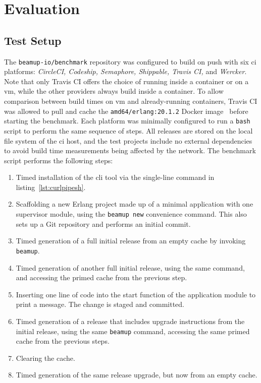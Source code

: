 \cleardoublepage
\section{Evaluation}


\subsection{Test Setup}
The \lstinline|beamup-io/benchmark| repository was configured to build on push with six \acrshort{ci} platforms: \emph{CircleCI, Codeship, Semaphore, Shippable, Travis CI,} and \emph{Wercker}. Note that only Travis CI offers the choice of running inside a container or on a \acrshort{vm}, while the other providers always build inside a container. To allow comparison between build times on \acrshort{vm} and already-running containers, Travis CI was allowed to pull and cache the \lstinline|amd64/erlang:20.1.2| Docker image~\cite{docker:erlang} before starting the benchmark. Each platform was minimally configured to run a \lstinline|bash| script to perform the same sequence of steps. All releases are stored on the local file system of the \acrshort{ci} host, and the test projects include no external dependencies to avoid build time measurements being affected by the network. The benchmark script performs the following steps:

\begin{enumerate}
  \item Timed installation of the \acrshort{cli} tool via the single-line command in listing~\ref{lst:curlpipesh}.
  \item Scaffolding a new Erlang project made up of a minimal application with one supervisor module, using the \lstinline|beamup new| convenience command. This also sets up a Git repository and performs an initial commit.
  \item Timed generation of a full initial release from an empty cache by invoking \lstinline|beamup|.
  \item Timed generation of another full initial release, using the same command, and accessing the primed cache from the previous step.
  \item Inserting one line of code into the start function of the application module to print a message. The change is staged and committed.
  \item Timed generation of a release that includes upgrade instructions from the initial release, using the same \lstinline|beamup| command, accessing the same primed cache from the previous steps.
  \item Clearing the cache.
  \item Timed generation of the same release upgrade, but now from an empty cache.
\end{enumerate}

